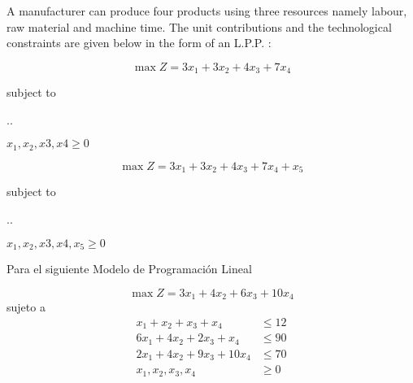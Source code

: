 \documentclass[../main.tex]{subfiles}
\begin{document}

\begin{questions}
\question %
A manufacturer can produce four products using three resources namely labour, raw material and machine time. The unit contributions and the technological constraints are given below in the form of an L.P.P. :

\[\max Z = 3x_1 + 3x_2 + 4x_3 + 7x_4 \]

{\centering
subject to

\sysdelim..%
%

\vspace{3mm}
$x_1, x_2, x3, x4 \geq 0$
\par}


\begin{solution}{}
  \[\max Z = 3x_1 + 3x_2 + 4x_3 + 7x_4 + x_5 \]

{\centering
subject to

\sysdelim..%
%

\vspace{3mm}
$x_1, x_2, x3, x4, x_5 \geq 0$
\par}
\end{solution}

\question
Para el siguiente Modelo de Programación Lineal

\[\max  Z = 3x_1 + 4x_2 + 6x_3 + 10x_4\]
sujeto a
\begin{align*}
  x_1 + x_2 + x_3 + x_4 & \leq 12 \\
  6x_1 + 4x_2 + 2x_3 + x_4 & \leq 90 \\
  2x_1 + 4x_2 + 9x_3 + 10x_4 & \leq 70 \\[5mm]
  x_1, x_2, x_3, x_4 & \geq 0
\end{align*}


\end{questions}
\end{document}
